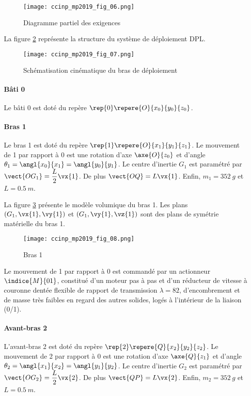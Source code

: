 \begin{figure}[!h]
\centering
\texttt{[image: ccinp\_mp2019\_fig\_06.png]}
\caption{Diagramme partiel des exigences \label{ccinp_mp2019_fig_06}}
\end{figure}

 La figure \ref{ccinp_mp2019_fig_07} représente la structure du système de déploiement DPL. 


\begin{figure}[!h]
\centering
\texttt{[image: ccinp\_mp2019\_fig\_07.png]}
\caption{Schématisation cinématique du bras de déploiement \label{ccinp_mp2019_fig_07}}
\end{figure}


\paragraph*{Bâti 0}
Le bâti 0 est doté du repère $\rep{0} \repere{O}{x_0}{y_0}{z_0}$.

\paragraph*{Bras 1}

Le bras 1 est doté du repère $\rep{1} \repere{O}{x_1}{y_1}{z_1}$. Le mouvement de 1 par rapport à 0 est une rotation d'axe $\axe{O}{z_0}$  et d'angle $\theta_1 = \angl{x_0}{x_1}= \angl{y_0}{y_1}$. Le centre d'inertie $G_1$ est paramétré par $\vect{OG_1} = \dfrac{L}{2} \vx{1}$. De plus $\vect{OQ} = L\vx{1}$. Enfin, $m_1 = \SI{352}{g}$ et $L=\SI{0,5}{m}$.

La figure \ref{ccinp_mp2019_fig_08} présente le modèle volumique du bras 1. Les plans $\left(G_1, \vx{1},\vy{1} \right)$  et $\left(G_1,\vy{1},\vz{1}\right)$ sont des plans de symétrie matérielle du bras 1.

\begin{figure}[!h]
\centering
\texttt{[image: ccinp\_mp2019\_fig\_08.png]}
\caption{Bras 1\label{ccinp_mp2019_fig_08}}
\end{figure}

Le mouvement de 1 par rapport à 0 est commandé par un actionneur $\indice{M}{01}$, constitué d’un moteur pas à pas et d’un réducteur de vitesse à couronne dentée flexible de rapport de transmission $\lambda = 82$, d’encombrement et de masse très faibles en regard des autres solides, logés à l’intérieur de la liaison (0/1).


\paragraph*{Avant-bras 2}
L'avant-bras 2 est doté du repère $\rep{2} \repere{Q}{x_2}{y_2}{z_2}$. Le mouvement de 2 par rapport à 0 est une rotation d'axe $\axe{Q}{z_1}$  et d'angle $\theta_2 = \angl{x_1}{x_2}= \angl{y_1}{y_2}$. Le centre d'inertie $G_2$ est paramétré par $\vect{OG_2} = \dfrac{L}{2} \vx{2}$. De plus $\vect{QP} = L\vx{2}$. Enfin, $m_2 = \SI{352}{g}$ et $L=\SI{0,5}{m}$.

